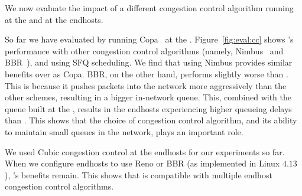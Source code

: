 We now evaluate the impact of a different congestion control algorithm running at the \inbox and at the endhosts.



 So far we have evaluated \name by running Copa~\cite{copa} at the \inbox.  
Figure~\ref{fig:eval:cc} shows \name's performance with other congestion control algorithms (namely, Nimbus~\cite{nimbus} and BBR~\cite{bbr}), and using SFQ scheduling. 
We find that using Nimbus provides similar benefits over \baseline as Copa. 
BBR, on the other hand, performs slightly worse than \baseline. 
This is because it pushes packets into the network more aggressively than the other schemes, resulting in a bigger in-network queue.
This, combined with the queue built at the \name, results in the endhosts experiencing higher queueing delays than \baseline. This shows that the choice of congestion control algorithm, and its ability to maintain small queues in the network, plays an important role. 


We used Cubic congestion control at the endhosts for our experiments so far. When we configure endhosts to use Reno or BBR (as implemented in Linux $4.13$), \name's benefits remain.
This shows that \name is compatible with multiple endhost congestion control algorithms.

